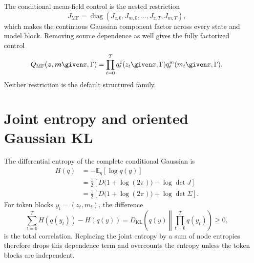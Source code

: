 The conditional mean-field control is the nested restriction
\begin{equation}
J_{\mathrm{MF}}
=\operatorname{diag}
(J_{z,0},J_{m,0},\ldots,J_{z,T},J_{m,T}),
\label{eq:mean-field-information-restriction}
\end{equation}
which makes the continuous Gaussian component factor across every state and model block.  Removing source dependence as well gives the fully factorized control
\begin{equation}
Q_{\mathrm{MF}}(\boldsymbol z,\boldsymbol m\given x,\Gamma)
=\prod_{t=0}^{T}
q_t^z(z_t\given x,\Gamma)
q_t^m(m_t\given x,\Gamma).
\label{eq:full-mean-field-control}
\end{equation}
Neither restriction is the default structured family.

\section{Joint entropy and oriented Gaussian KL}

The differential entropy of the complete conditional Gaussian is
\begin{equation}
\begin{aligned}
H(q)
&=-\mathbb E_q[\log q(y)]\\
&=\frac12
\left[
D\bigl(1+\log(2\pi)\bigr)-\log\det J
\right]\\
&=\frac12
\left[
D\bigl(1+\log(2\pi)\bigr)+\log\det\Sigma
\right].
\end{aligned}
\label{eq:full-joint-gaussian-entropy}
\end{equation}
For token blocks $y_t=(z_t,m_t)$, the difference
\begin{equation}
\sum_{t=0}^{T}H(q(y_t))-H(q(y))
=D_{\mathrm{KL}}
\left(
q(y)\middle\Vert\prod_{t=0}^{T}q(y_t)
\right)
\geq0,
\label{eq:gaussian-total-correlation}
\end{equation}
is the total correlation.  Replacing the joint entropy by a sum of node entropies therefore drops this dependence term and overcounts the entropy unless the token blocks are independent.

